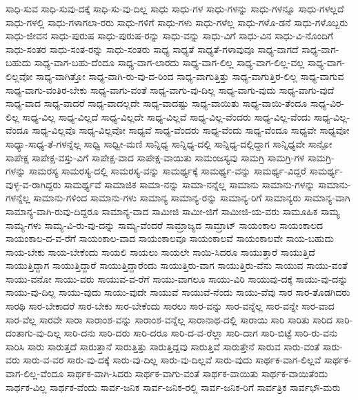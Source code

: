 {ಸಾಧಿ-ಸುವ
ಸಾಧಿ-ಸುವು-ದಕ್ಕೆ
ಸಾಧಿ-ಸು-ವು-ದಿಲ್ಲ
ಸಾಧು
ಸಾಧು-ಗಳ
ಸಾಧು-ಗಳನ್ನು
ಸಾಧು-ಗಳನ್ನೂ
ಸಾಧು-ಗಳಲ್ಲದೆ
ಸಾಧು-ಗಳಲ್ಲಿ
ಸಾಧು-ಗಳಾಗಲಾ-ರರು
ಸಾಧು-ಗಳಿಗೆ
ಸಾಧು-ಗಳು
ಸಾಧು-ಗಳೆಲ್ಲ
ಸಾಧು-ಗಳೊ-ಡನೆ
ಸಾಧು-ಗಳೊಬ್ಬರು
ಸಾಧು-ಜೀವನ
ಸಾಧು-ಪುರುಷ
ಸಾಧು-ಪುರುಷ-ರನ್ನು
ಸಾಧು-ವನ್ನು
ಸಾಧು-ವಿಗೆ
ಸಾಧು-ವಿನ
ಸಾಧು-ವಿ-ನೊಂದಿಗೆ
ಸಾಧು-ಸಂತರ
ಸಾಧು-ಸಂತ-ರನ್ನು
ಸಾಧು-ಸಂತರು
ಸಾಧ್ಯ
ಸಾಧ್ಯತೆ
ಸಾಧ್ಯತೆ-ಗಳಾವುವೂ
ಸಾಧ್ಯ-ವಾಗದೆ
ಸಾಧ್ಯ-ವಾಗ-ಬಹುದು
ಸಾಧ್ಯ-ವಾಗ-ಬಹು-ದೆಂದೂ
ಸಾಧ್ಯ-ವಾಗ-ಲಾರದು
ಸಾಧ್ಯ-ವಾಗ-ಲಿಲ್ಲ
ಸಾಧ್ಯ-ವಾಗ-ಲಿಲ್ಲ-ವಲ್ಲ
ಸಾಧ್ಯ-ವಾಗ-ಲಿಲ್ಲವೋ
ಸಾಧ್ಯ-ವಾಗಿತ್ತೋ
ಸಾಧ್ಯ-ವಾಗಿ-ರು-ವು-ದ-ರಿಂದ
ಸಾಧ್ಯ-ವಾಗುತ್ತಿತ್ತು
ಸಾಧ್ಯ-ವಾಗುತ್ತಿರ-ಲಿಲ್ಲ
ಸಾಧ್ಯ-ವಾಗುವ
ಸಾಧ್ಯ-ವಾಗು-ವಂತಿರ-ಬೇಕು
ಸಾಧ್ಯ-ವಾಗು-ವಂತೆ
ಸಾಧ್ಯ-ವಾಗು-ವು-ದಿಲ್ಲ
ಸಾಧ್ಯ-ವಾಗು-ವುದು
ಸಾಧ್ಯ-ವಾಗು-ವುದೆ
ಸಾಧ್ಯ-ವಾದ
ಸಾಧ್ಯ-ವಾದರೆ
ಸಾಧ್ಯ-ವಾದಲ್ಲದೇ
ಸಾಧ್ಯ-ವಾದಷ್ಟು
ಸಾಧ್ಯ-ವಾಯಿತು
ಸಾಧ್ಯ-ವಾಯಿ-ತೆಂದೂ
ಸಾಧ್ಯ-ವಿರ-ಲಿಲ್ಲ
ಸಾಧ್ಯ-ವಿಲ್ಲ
ಸಾಧ್ಯ-ವಿಲ್ಲದೆ
ಸಾಧ್ಯ-ವಿಲ್ಲದೇ
ಸಾಧ್ಯ-ವಿಲ್ಲವೆ
ಸಾಧ್ಯ-ವಿಲ್ಲ-ವೆಂದರು
ಸಾಧ್ಯ-ವಿಲ್ಲ-ವೆಂದು
ಸಾಧ್ಯ-ವಿಲ್ಲ-ವೆಂದೂ
ಸಾಧ್ಯ-ವಿಲ್ಲವೊ
ಸಾಧ್ಯ-ವಿಲ್ಲವೋ
ಸಾಧ್ಯವೆ
ಸಾಧ್ಯ-ವೆಂದರು
ಸಾಧ್ಯ-ವೆಂದು
ಸಾಧ್ಯ-ವೆಂದೂ
ಸಾಧ್ಯವೇ
ಸಾಧ್ಯವೋ
ಸಾಧ್ಯಾ-ಸಾಧ್ಯ-ತೆ-ಗಳನ್ನೆಲ್ಲ
ಸಾಧ್ವಿ
ಸಾಧ್ವೀ-ಮಣಿ
ಸಾನ್ನಿಧ್ಯ
ಸಾನ್ನಿಧ್ಯ-ದಲ್ಲಿ
ಸಾನ್ನಿಧ್ಯ-ದಲ್ಲಿದ್ದಾಗ
ಸಾನ್ನಿಧ್ಯವೇ
ಸಾನ್ಪೋ
ಸಾಪೇಕ್ಷ
ಸಾಪೇಕ್ಷ-ವಸ್ತು-ವಿಗೆ
ಸಾಪೇಕ್ಷ-ವಾದ
ಸಾಪೇಕ್ಷ-ವಾಯಿತು
ಸಾಮಂಜಸ್ಯವು
ಸಾಮಗ್ರಿ
ಸಾಮಗ್ರಿ-ಗಳ
ಸಾಮಗ್ರಿ-ಗಳನ್ನು
ಸಾಮರಸ್ಯ
ಸಾಮರಸ್ಯ-ದಲ್ಲಿ
ಸಾಮರಸ್ಯ-ವನ್ನು
ಸಾಮರ್ಥ್ಯಕ್ಕೆ
ಸಾಮರ್ಥ್ಯ-ವನ್ನು
ಸಾಮರ್ಥ್ಯ-ವಿದ್ದರೆ
ಸಾಮರ್ಥ್ಯ-ವುಳ್ಳ-ವ-ರಾಗಿದ್ದರು
ಸಾಮರ್ಥ್ಯವೆ
ಸಾಮಾಜಿಕ
ಸಾಮಾ-ನನ್ನು
ಸಾಮಾ-ನನ್ನೆಲ್ಲ
ಸಾಮಾನು
ಸಾಮಾನು-ಗಳನ್ನು
ಸಾಮಾನು-ಗಳನ್ನೆಲ್ಲ
ಸಾಮಾನು-ಗಳಿಂದ
ಸಾಮಾನು-ಗಳು
ಸಾಮಾನ್ಯ
ಸಾಮಾನ್ಯ-ರನ್ನು
ಸಾಮಾನ್ಯ-ರಿಗೆ
ಸಾಮಾನ್ಯರು
ಸಾಮಾನ್ಯ-ವಾಗಿ
ಸಾಮಾನ್ಯ-ವಾಗಿ-ರುವು-ದಿದ್ದರೂ
ಸಾಮಾನ್ಯ-ವಾದ
ಸಾಮೀಜಿ
ಸಾಮೀ-ಜಿಗೆ
ಸಾಮೀಜಿ-ಯ-ವರು
ಸಾಮೂಹಿಕ
ಸಾಮ್ಯ
ಸಾಮ್ಯ-ಗಳು
ಸಾಮ್ಯ-ವಿ-ರು-ವು-ದನ್ನು
ಸಾಮ್ಯ-ವೆಂದರೆ
ಸಾಮ್ರಾಜ್ಯದ
ಸಾಮ್ರಾಟ್
ಸಾಯಂಕಾಲ
ಸಾಯಂಕಾಲದ
ಸಾಯಂಕಾಲ-ದ-ವ-ರೆಗೆ
ಸಾಯಂಕಾಲ-ವಾದ
ಸಾಯಂಕಾಲವೂ
ಸಾಯಂಕಾಲವೆ
ಸಾಯಂಕಾಲವೇ
ಸಾಯ-ಬಹುದು
ಸಾಯ-ಬೇಕು
ಸಾಯ-ಬೇಕೆಂದು
ಸಾಯಲಿ
ಸಾಯಲು
ಸಾಯಲೇ
ಸಾಯಿ-ಸಿದರೂ
ಸಾಯುತ್ತಾರೆ
ಸಾಯುತ್ತಿದೆ
ಸಾಯುತ್ತಿದ್ದಾಗ
ಸಾಯುತ್ತಿದ್ದಾರೆ
ಸಾಯುತ್ತಿದ್ದಾರೆಂದು
ಸಾಯುತ್ತಿರು-ವಾಗ
ಸಾಯುತ್ತಿರು-ವೆನು
ಸಾಯುವ
ಸಾಯು-ವಂತೆ
ಸಾಯು-ವನೋ
ಸಾಯು-ವರು
ಸಾಯುವ-ವ-ರೆಗೆ
ಸಾಯು-ವಾಗಲೂ
ಸಾಯು-ವಿರಿ
ಸಾಯುವು-ದಕ್ಕೆ
ಸಾಯು-ವು-ದನ್ನು
ಸಾಯು-ವು-ದಿಲ್ಲ
ಸಾಯು-ವುದು
ಸಾಯು-ವುದೇ
ಸಾಯುವೆ
ಸಾಯುವೆ-ನೆಂದು
ಸಾಯು-ವೆವು
ಸಾರ
ಸಾರ-ತೊಡಗಿದರು
ಸಾರಥಿ
ಸಾರ-ಬೇಕಾದರೆ
ಸಾರ-ಬೇಕು
ಸಾರ-ಬೇಕೆಂದು
ಸಾರಲು
ಸಾರ-ವನ್ನು
ಸಾರ-ವನ್ನೆಲ್ಲ
ಸಾರ-ವನ್ನೇ
ಸಾರ-ವಾದ
ಸಾರ-ವೆಲ್ಲ
ಸಾರವೇ
ಸಾರಾ
ಸಾರಾಂಶ-ವನ್ನು
ಸಾರಾಂಶ-ವನ್ನೆಲ್ಲ
ಸಾರಾನಾಥ-ದಲ್ಲಿ
ಸಾರಾಯಿ
ಸಾರಿ
ಸಾರಿತು
ಸಾರಿದ
ಸಾರಿ-ದಂತಾಗು-ವು-ದಿಲ್ಲ
ಸಾರಿ-ದನು
ಸಾರಿ-ದರು
ಸಾರಿ-ದರೂ
ಸಾರಿ-ದ-ವ-ರೆಲ್ಲಾ
ಸಾರಿ-ದಾಗ
ಸಾರಿ-ಬಿಟ್ಟೆ
ಸಾರಿ-ರು-ವನು
ಸಾರಿಸಿ
ಸಾರು
ಸಾರುತ್ತದೆ
ಸಾರುತ್ತಾನೆ
ಸಾರುತ್ತಿತ್ತು
ಸಾರುತ್ತಿದ್ದವು
ಸಾರುತ್ತಿವೆ
ಸಾರುತ್ತೇನೆ
ಸಾರುವ
ಸಾರು-ವಂತೆ
ಸಾರು-ವರು
ಸಾರು-ವ-ವರ
ಸಾರು-ವು-ದಕ್ಕೆ
ಸಾರು-ವು-ದಿಲ್ಲ
ಸಾರು-ವು-ದಿಲ್ಲವೆ
ಸಾರು-ವುದು
ಸಾರ್ಥಕ-ವಾಗ-ಲಿಲ್ಲವೆ
ಸಾರ್ಥಕ-ವಾಗ-ಲಿಲ್ಲ-ವೆಂದೂ
ಸಾರ್ಥಕ-ವಾಗಿ-ಸಿದರು
ಸಾರ್ಥಕ-ವಾಗು-ವಂತೆ
ಸಾರ್ಥಕ-ವಾಯಿತು
ಸಾರ್ಥಕ-ವಾಯಿತೆಂದು
ಸಾರ್ಥಕ-ವಿಲ್ಲ
ಸಾರ್ಥಕ-ವೆಂದು
ಸಾರ್ವ-ಜನಿಕ
ಸಾರ್ವ-ಜನಿಕ-ರಲ್ಲಿ
ಸಾರ್ವ-ಜನಿಕ-ರಿಗೆ
ಸಾರ್ವತ್ರಿಕ
ಸಾರ್ವಭೌ-ಮರು
}
